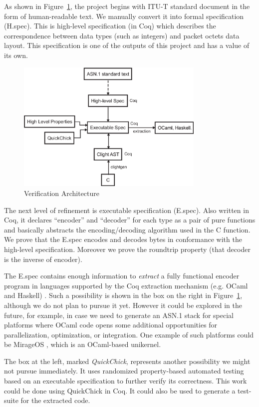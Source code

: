 \documentclass[10p,conference]{IEEEtran}
\begin{document}
As shown in Figure~\ref{fig:components}, the project begins with ITU-T
standard document in the form of human-readable text. We manually
convert it into formal specification (H.spec). This is high-level
specification (in Coq) which describes the correspondence between data
types (such as integers) and packet octets data layout. This
specification is one of the outputs of this project and has a value of
its own.

\begin{figure}[h!]
  \centering
  \includegraphics[width=9cm]{VerificationArchitectureDiagram.eps}
  \caption{Verification Architecture}
  \label{fig:components}
\end{figure}

The next level of refinement is executable specification (E.spec). Also
written in Coq, it declares ``encoder'' and ``decoder'' for each type
as a pair of pure functions and basically abstracts the encoding/decoding algorithm used in the C function. We prove that the E.spec encodes and decodes bytes in conformance with the high-level
specification. Moreover we prove the roundtrip property (that decoder is the inverse of encoder).

The E.spec contains enough
information to \textit{extract} a fully functional encoder program in
languages supported by the Coq extraction mechanism (e.g. OCaml and
Haskell) \cite{Extraction}. Such a possibility is shown in the box
on the right in Figure~\ref{fig:components}, although we do not plan to
pursue it yet. However it could be explored in the future, for example,
in case we need to generate an ASN.1 stack for special platforms where
OCaml code opens some additional opportunities for parallelization,
optimization, or integration. One example of such platforms could be
MirageOS \cite{MirageOS}, which is an OCaml-based unikernel.

The box at the left, marked \textit{QuickChick}, represents another
possibility we might not pursue immediately. It uses randomized
property-based automated testing based on an executable
specification to further verify its correctness. This work could be
done using QuickChick \cite{QuickChick} in Coq. It could also be used
to generate a test-suite for the extracted code.
\end{document}
